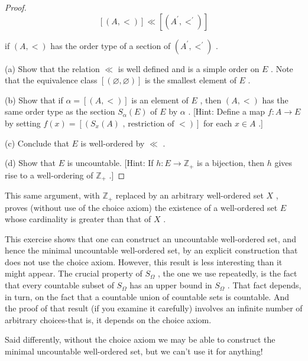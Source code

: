 \begin{proof}
\[
\left\lbrack  \left( {A, < }\right) \right\rbrack \ll  \left\lbrack  \left( {{A}^{\prime },{ < }^{\prime }}\right) \right\rbrack
\]

if \(\left( {A, < }\right)\) has the order type of a section of \(\left( {{A}^{\prime },{ < }^{\prime }}\right)\) .

(a) Show that the relation \(\ll\) is well defined and is a simple order on \(E\) . Note that the equivalence class \(\left\lbrack  \left( {\varnothing ,\varnothing }\right) \right\rbrack\) is the smallest element of \(E\) .

(b) Show that if \(\alpha  = \left\lbrack  \left( {A, < }\right) \right\rbrack\) is an element of \(E\) , then \(\left( {A, < }\right)\) has the same order type as the section \({S}_{\alpha }\left( E\right)\) of \(E\) by \(\alpha\) . [Hint: Define a map \(f : A \rightarrow  E\) by setting \(f\left( x\right)  = \left\lbrack  \left( {{S}_{x}\left( A\right) \text{ , restriction of } < }\right) \right\rbrack\) for each \(x \in  A\) .]

(c) Conclude that \(E\) is well-ordered by \(\ll\) .

(d) Show that \(E\) is uncountable. [Hint: If \(h : E \rightarrow  {\mathbb{Z}}_{ + }\) is a bijection, then \(h\) gives rise to a well-ordering of \({\mathbb{Z}}_{ + }\) .]
\end{proof}

This same argument, with \({\mathbb{Z}}_{ + }\) replaced by an arbitrary well-ordered set \(X\) , proves (without use of the choice axiom) the existence of a well-ordered set \(E\) whose cardinality is greater than that of \(X\) .

This exercise shows that one can construct an uncountable well-ordered set, and hence the minimal uncountable well-ordered set, by an explicit construction that does not use the choice axiom. However, this result is less interesting than it might appear. The crucial property of \({S}_{\Omega }\) , the one we use repeatedly, is the fact that every countable subset of \({S}_{\Omega }\) has an upper bound in \({S}_{\Omega }\) . That fact depends, in turn, on the fact that a countable union of countable sets is countable. And the proof of that result (if you examine it carefully) involves an infinite number of arbitrary choices-that is, it depends on the choice axiom.

Said differently, without the choice axiom we may be able to construct the minimal uncountable well-ordered set, but we can't use it for anything!